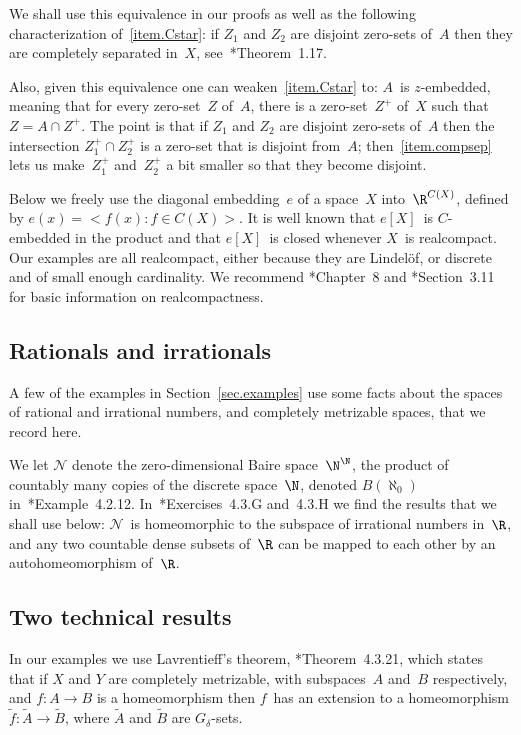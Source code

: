 \documentclass[a4paper]{amsart}
\newcommand\calN{\mathcal{N}}
\theoremstyle{plain}
\theoremstyle{definition}
\theoremstyle{remark}
\begin{document}
We shall use this equivalence in our proofs as well as the following
characterization of~\eqref{item.Cstar}: if $Z_1$ and $Z_2$ are disjoint 
zero-sets of~$A$ then they are completely separated in~$X$,
see~\cite{MR0407579}*{Theorem~1.17}.

Also, given this equivalence one can weaken~\eqref{item.Cstar} to:
$A$~is $z$-embedded, meaning that for every zero-set~$Z$ of~$A$, there
is a zero-set~$Z^+$ of~$X$ such that $Z=A\cap Z^+$.
The point is that if $Z_1$ and $Z_2$ are disjoint zero-sets of~$A$ then
the intersection $Z_1^+\cap Z_2^+$ is a zero-set that is disjoint from~$A$;
then~\eqref{item.compsep} lets us make~$Z_1^+$ and~$Z_2^+$ a bit smaller
so that they become disjoint. 

\smallbreak
Below we freely use the diagonal embedding~$e$ of a space~$X$ into~$\R^{C(X)}$,
defined by $e(x)=\bigl<f(x):f\in C(X)\bigr>$.
It is well known that $e[X]$~is $C$-embedded in the product and that
$e[X]$~is closed whenever $X$~is realcompact.
Our examples are all realcompact, either because they are Lindel\"of,
or discrete and of small enough cardinality.
We recommend \cite{MR0407579}*{Chapter~8} and 
\cite{MR1039321}*{Section~3.11} for basic information on realcompactness.

\subsection{Rationals and irrationals}

A few of the examples in Section~\ref{sec.examples} use some facts about
the spaces of rational and irrational numbers, and completely metrizable
spaces, that we record here.

We let $\calN$ denote the zero-dimensional Baire space~$\N^\N$,
the product of countably many copies of the discrete space~$\N$,
denoted $B(\aleph_0)$ in~\cite{MR1039321}*{Example~4.2.12}.
In~\cite{MR1039321}*{Exercises~4.3.G and~4.3.H} we find the results that 
we shall use below: $\calN$~is homeomorphic to the subspace of irrational
numbers in~$\R$, and any two countable dense subsets of~$\R$ can be mapped 
to each other by an autohomeomorphism of~$\R$.

\subsection{Two technical results}\label{subsec.special}

In our examples we use Lavrentieff's theorem, 
\cite{MR1039321}*{Theorem~4.3.21}, which states that
if $X$ and $Y$ are completely metrizable, with subspaces~$A$ and~$B$ 
respectively, and $f:A\to B$ is a homeomorphism
then $f$~has an extension to a homeomorphism $\tilde f:\tilde A\to\tilde B$,
where $\tilde A$ and $\tilde B$ are $G_\delta$-sets.
\end{document}
